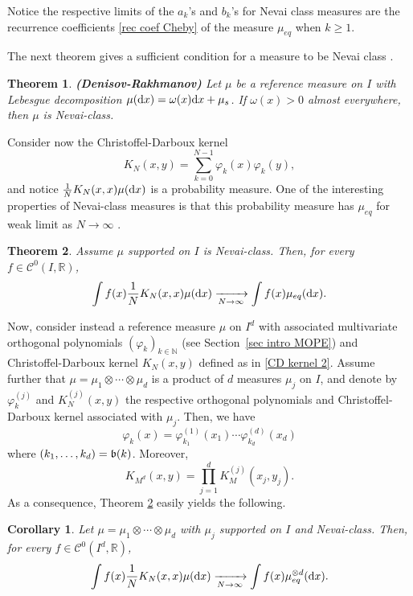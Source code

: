 \documentclass[a4paper,11pt]{article}
\numberwithin{equation}{section}
\newtheorem{theorem}{Theorem}[]
\newtheorem{corollary}[]{Corollary}
\theoremstyle{definition}
\newcommand{\eq}{\begin{equation}}
\newcommand{\qe}{\end{equation}}
\newcommand{\R}{\mathbb{R}}
\renewcommand{\geq}{\geqslant}
\renewcommand{\phi}{\varphi}
\renewcommand{\d}{ {\rm d}}
\begin{document}
Notice the respective limits of the $a_k$'s and $b_k$'s for Nevai class measures
are the recurrence coefficients \eqref{rec coef Cheby} of the measure $\mu_{eq}$
when $k\geq 1$.

The next theorem gives a sufficient condition for a measure to be Nevai class  \cite[Theorem 1.4.2]{Sim11}.

\begin{theorem}{\bf (Denisov-Rakhmanov)}
\label{DR theorem}
\label{Rakhmanov-Denisov}
Let $\mu$ be a reference measure on $I$ with Lebesgue decomposition $\mu(\d
x)=\omega(x)\d x + \mu_{s}$. If $\omega(x)>0$ almost everywhere, then  $\mu$ is Nevai-class.
\end{theorem}


Consider now the Christoffel-Darboux kernel
\eq
\label{CD kernel 2}
K_N(x,y)=\sum_{k=0}^{N-1}\phi_k(x)\phi_k(y),
\qe
and notice $\frac1N K_N(x,x)\mu(\d x)$ is a probability measure. One of the
interesting properties of Nevai-class measures is that this probability measure
has $\mu_{eq}$ for weak limit as $N\to\infty$ \citep{StTo92}.

\begin{theorem}
\label{weak conv eq 1D}
Assume $\mu$ supported on $I$ is Nevai-class. Then, for every $f\in\mathscr C^0(I,\R)$,
$$
\int f(x)  \frac1NK_N(x,x)\mu(\d x) \xrightarrow[N\to\infty]{} \int f(x)\mu_{eq}(\d x).
$$
\end{theorem}

Now, consider instead a reference measure $\mu$ on $I^d$ with associated
multivariate orthogonal polynomials $(\phi_k)_{k\in\mathbb{N}}$ (see Section~\ref{sec intro
  MOPE}) and Christoffel-Darboux kernel $K_N(x,y)$ defined as in \eqref{CD kernel 2}. Assume further that $\mu=\mu_1\otimes\cdots\otimes\mu_d$ is a product of $d$ measures $\mu_j$ on $I$, and denote by $\phi_k^{(j)}$ and $K_N^{(j)}(x,y)$ the respective orthogonal polynomials and  Christoffel-Darboux kernel associated with $\mu_j$. Then, we have
\eq
\phi_k(x)=\phi_{k_1}^{(1)}(x_1)\cdots\phi_{k_d}^{(d)}(x_d)
\label{e:mope}
\qe
where $(k_1,\ldots,k_d)=\frak b(k)$. Moreover,
\eq
\label{CD kernel split}
K_{M^d}(x,y)=\prod_{j=1}^d K_M^{(j)}(x_j,y_j).
\qe
As a consequence, Theorem \ref{weak conv eq 1D} easily yields the following.

\begin{corollary}
\label{weak conv eq}
Let $\mu=\mu_1\otimes\cdots\otimes\mu_d$ with $\mu_j$ supported on $I$ and Nevai-class. Then, for every $f\in\mathscr C^0(I^d,\R)$,
\eq
\label{weak conv eq explicit}
\int f(x)  \frac1NK_N(x,x)\mu(\d x) \xrightarrow[N\to\infty]{} \int f(x)\mu_{eq}^{\otimes d}(\d x).
\qe
\end{corollary}
\end{document}

